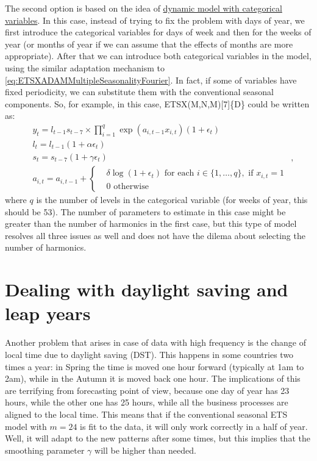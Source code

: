 \documentclass[
]{book}
\theoremstyle{definition}
\theoremstyle{definition}
\theoremstyle{definition}
\theoremstyle{definition}
\theoremstyle{remark}
\begin{document}
The second option is based on the idea of \protect\hyperlink{ETSXDynamicCategories}{dynamic model with categorical variables}. In this case, instead of trying to fix the problem with days of year, we first introduce the categorical variables for days of week and then for the weeks of year (or months of year if we can assume that the effects of months are more appropriate). After that we can introduce both categorical variables in the model, using the similar adaptation mechanism to \eqref{eq:ETSXADAMMultipleSeasonalityFourier}. In fact, if some of variables have fixed periodicity, we can substitute them with the conventional seasonal components. So, for example, in this case, ETSX(M,N,M){[}7{]}\{D\} could be written as:
\begin{equation}
  \begin{aligned}
    & {y}_{t} = l_{t-1} s_{t-7} \times \prod_{i=1}^q \exp(a_{i,t-1} x_{i,t}) (1 + \epsilon_t) \\
    & l_t = l_{t-1} (1 + \alpha\epsilon_t) \\
    & s_t = s_{t-7} (1 + \gamma\epsilon_t) \\
    & a_{i,t} = a_{i,t-1} + \left \lbrace \begin{aligned}
      &\delta \log(1+\epsilon_t) \text{ for each } i \in \{1, \dots, q\}, \text{ if } x_{i,t} = 1 \\
      &0 \text{ otherwise }
    \end{aligned} \right.
  \end{aligned},
\label{eq:ETSXADAMMultipleSeasonalityCategories}
\end{equation}
where \(q\) is the number of levels in the categorical variable (for weeks of year, this should be 53). The number of parameters to estimate in this case might be greater than the number of harmonics in the first case, but this type of model resolves all three issues as well and does not have the dilema about selecting the number of harmonics.

\hypertarget{MultipleFrequenciesDSTandLeap}{%
\section{Dealing with daylight saving and leap years}\label{MultipleFrequenciesDSTandLeap}}

Another problem that arises in case of data with high frequency is the change of local time due to daylight saving (DST). This happens in some countries two times a year: in Spring the time is moved one hour forward (typically at 1am to 2am), while in the Autumn it is moved back one hour. The implications of this are terrifying from forecasting point of view, because one day of year has 23 hours, while the other one has 25 hours, while all the business processes are aligned to the local time. This means that if the conventional seasonal ETS model with \(m=24\) is fit to the data, it will only work correctly in a half of year. Well, it will adapt to the new patterns after some times, but this implies that the smoothing parameter \(\gamma\) will be higher than needed.
\end{document}
